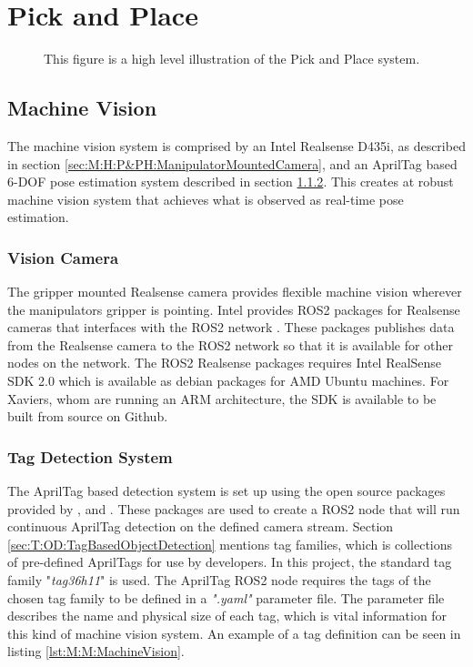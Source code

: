 \section{Pick and Place} \label{M:PickAndPlace}


\begin{figure}[htp]
    \fontsize{9}{14}\selectfont
    \centering
    
    \caption{This figure is a high level illustration of the Pick and Place system. }
    \label{fig:M:PAP:PickAndPlaceMethod}
\end{figure}

\subsection{Machine Vision} \label{sec:M:MRC:MachineVision}
The machine vision system is comprised by an Intel Realsense D435i, as described in section \ref{sec:M:H:P&PH:ManipulatorMountedCamera}, and an AprilTag based 6-DOF pose estimation system described in section \ref{sec:M:MRC:MV:TagDetectionSystem}. This creates at robust machine vision system that achieves what is observed as real-time pose estimation.

\subsubsection{Vision Camera} 
The gripper mounted Realsense camera provides flexible machine vision wherever the manipulators gripper is pointing. Intel provides ROS2 packages for Realsense cameras that interfaces with the ROS2 network \cite{realsense_ros_repo}. These packages publishes data from the Realsense camera to the ROS2 network so that it is available for other nodes on the network. The ROS2 Realsense packages requires Intel RealSense SDK 2.0 which is available as debian packages for AMD Ubuntu machines. For Xaviers, whom are running an ARM architecture, the SDK is available to be built from source on Github\cite{realsense_jetson_guide}.

\subsubsection{Tag Detection System} \label{sec:M:MRC:MV:TagDetectionSystem}
The AprilTag based detection system is set up using the open source packages provided by \cite{apriltag_repo}, \cite{apriltag_ros_repo} and \cite{apriltag_msgs_repo}. These packages are used to create a ROS2 node that will run continuous AprilTag detection on the defined camera stream. Section \ref{sec:T:OD:TagBasedObjectDetection} mentions tag families, which is collections of pre-defined AprilTags for use by developers. In this project, the standard tag family "\textit{tag36h11}" is used. The AprilTag ROS2 node requires the tags of the chosen tag family to be defined in a \textit{".yaml"} parameter file. The parameter file describes the name and physical size of each tag, which is vital information for this kind of machine vision system. An example of a tag definition can be seen in listing \ref{lst:M:M:MachineVision}.

